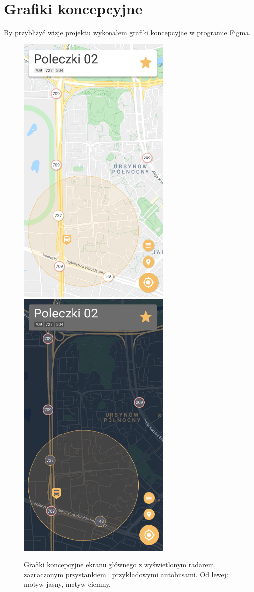 \documentclass{SGGW-thesis}
\begin{document}
\section{Grafiki koncepcyjne}
By przybliżyć wizje projektu wykonałem grafiki koncepcyjne w programie Figma.
\begin{figure}[!htb]
  \centering
  \includegraphics[width=75mm]{koncepty/screen_day_click_stop}
  \enspace
  \includegraphics[width=75mm]{koncepty/screen_night_click_stop}
  \caption[Ekran główny - koncept]{
    \label{koncept.ekran_glowny}
    Grafiki koncepcyjne ekranu głównego z wyświetlonym radarem, zaznaczonym przystankiem i przykładowymi autobusami. Od lewej: motyw jasny, motyw ciemny. \vspace{2ex}
  }
\end{figure}
\end{document}
